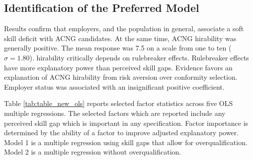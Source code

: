 \documentclass[review]{elsarticle}
\begin{document}



\subsection{Identification of the Preferred Model}

Results confirm that employers, and the population in general, associate a soft skill deficit with ACNG candidates.
At the same time, ACNG hirability was generally positive.
The mean response was 7.5 on a scale from one to ten ($\sigma = 1.80$).
hirability critically depends on rulebreaker effects.
Rulebreaker effects have more explanatory power than perceived skill gaps.
Evidence favors an explanation of ACNG hirability from risk aversion over conformity selection.
Employer status was associated with an insignificant positive coefficient.

Table \ref{tab:table_new_ols} reports selected factor statistics across five OLS multiple regressions.
The selected factors which are reported include any perceived skill gap which is important in any specification.
Factor importance is determined by the ability of a factor to improve adjusted explanatory power.
Model 1 is a multiple regression using skill gaps that allow for overqualification.
Model 2 is a multiple regression without overqualification.
\end{document}
